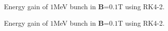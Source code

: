 \documentclass[a4paper,oneside,12pt]{report}
\numberwithin{equation}{chapter}
\begin{document}
{\begin{figure}[H]
    \caption{Energy gain of $1$MeV bunch in \textbf{B}=$0.1$T using RK4-2.}
    \label{fig:mag_rk_render}
\end{figure} \fi
\begin{figure}
    \centering
    \vspace{20pt}
    \vspace{20pt}
    \caption{\centering Energy gain of $1$MeV bunch in \textbf{B}=$0.1$T using RK4-2.} 
    \label{fig:mag_rk_render}
\end{figure}

}
\end{document}
